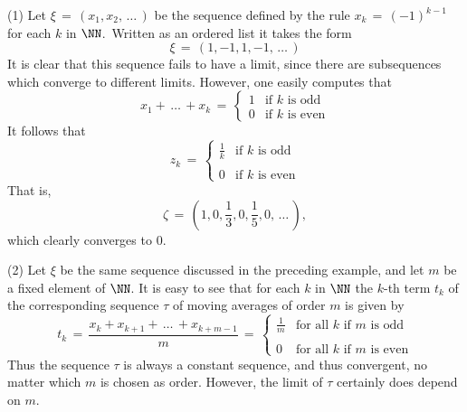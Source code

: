 {\hspace*{\parindent}
        (1) Let ${\xi} \,=\, (x_{1},x_{2},\,{\ldots}\,)$ be the sequence defined by the rule $x_{k} \,=\, (-1)^{k-1}$ for each $k$ in ${\NN}$.\
    Written as an ordered list it takes the form
        \begin{displaymath}
        {\xi} \,=\, (1,-1,1,-1,\,{\ldots}\,)
        \end{displaymath}
    It is clear that this sequence fails to have a limit, since there are subsequences which converge to different limits.
    However, one easily computes that
        \begin{displaymath}
        x_{1} + \,{\ldots}\, + x_{k} \,=\, \left\{
        \begin{array}{ll}
        1 & \mbox{if $k$ is odd} \\
        0 & \mbox{if $k$ is even}
        \end{array}
                \right.
        \end{displaymath}
    It follows that
        \begin{displaymath}
        z_{k} \,=\, \left\{
        \begin{array}{ll}
        {\displaystyle \frac{1}{k}} & \mbox{if $k$ is odd} \\
        &                                \\
        0 & \mbox{if $k$ is even}
        \end{array}
                        \right.
        \end{displaymath}
    That is,
        \begin{displaymath}
        {\zeta} \,=\, \left(1,0,\frac{1}{3},0,\frac{1}{5},0,\,{\ldots}\,\right),
        \end{displaymath}
    which clearly converges to $0$.

\V

        (2) Let ${\xi}$ be the same sequence discussed in the preceding example, and let $m$ be a fixed element of ${\NN}$.
    It is easy to see that for each $k$ in ${\NN}$ the $k$-th term $t_{k}$ of the corresponding sequence ${\tau}$ of moving averages of order $m$ is given by
        \begin{displaymath}
        t_{k} \,=\, \frac{x_{k}+x_{k+1}+\,{\ldots}\,+x_{k+m-1}}{m} \,=\, 
        \left\{
        \begin{array}{ll}
        {\displaystyle \frac{1}{m}} & \mbox{for all $k$ if $m$ is odd} \\
                                    &                      \\
        0                           & \mbox{for all $k$ if $m$ is even}
        \end{array}
                        \right.
        \end{displaymath}
    Thus the sequence ${\tau}$ is always a constant sequence, and thus convergent, no matter which $m$ is chosen as order.
    However, the limit of ${\tau}$ certainly does depend on $m$.

}
